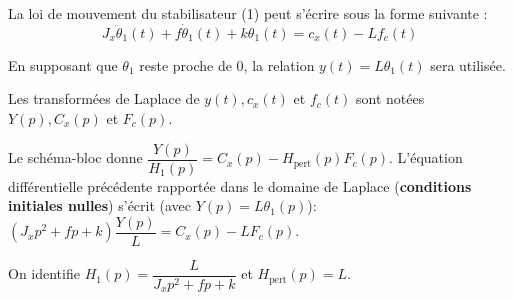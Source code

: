 %
%
%
%



La loi de mouvement du stabilisateur (1) peut s'écrire sous la forme suivante :
$$
J_{x} \ddot{\theta}_{1}(t)+f \dot{\theta}_{1}(t)+k \theta_{1}(t)=c_{x}(t)-L f_{c}(t)
$$

En supposant que $\theta_{1}$ reste proche de 0, la relation $y(t)=L \theta_{1}(t)$ sera utilisée.

Les transformées de Laplace de $y(t), c_{x}(t)$ et $f_{c}(t)$ sont notées $Y(p), C_{x}(p)$ et $F_{c}(p)$.

\ifprof
\begin{corrige}
Le schéma-bloc donne $\dfrac{Y(p)}{H_1(p)} = C_x(p) - H_{\text{pert}}(p)F_c(p)$. L'équation différentielle précédente rapportée dans le domaine de Laplace (\textbf{conditions initiales nulles}) s'écrit (avec $Y(p) = L \theta_1(p)$):
$ \left( J_x p^2 + f p + k \right)\dfrac{Y(p)}{L} = C_x(p) - L F_c(p) $.

On identifie $\boxed{H_1(p) = \dfrac{L}{J_x p^2 + f p + k}}$ et $\boxed{H_{\text{pert}}(p) = L}$.
\end{corrige}
\else
\fi


